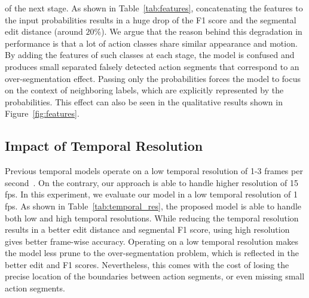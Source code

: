 \documentclass[10pt,twocolumn,letterpaper]{article}
\begin{document}
of the next stage. As shown in Table~\ref{tab:features}, concatenating 
the features to the input probabilities results in a huge drop of the F1 score 
and the segmental edit distance (around $20\%$). We argue that the reason behind this 
degradation in performance is that a lot of action classes share similar appearance 
and motion. By adding the features of such classes at each stage, the model 
is confused and produces small separated falsely detected action segments 
that correspond to an over-segmentation effect. Passing only the probabilities 
forces the model to focus on the context of neighboring labels, which are explicitly 
represented by the probabilities. This effect can also be seen in the qualitative 
results shown in Figure~\ref{fig:features}.


\subsection{Impact of Temporal Resolution}

Previous temporal models operate on a low temporal resolution of 1-3 frames 
per second~\cite{Lea_2017_CVPR, lei2018temporal, ding2018weakly}. On the 
contrary, our approach is able to handle higher resolution of 15 fps. 
In this experiment, we evaluate our model in a low temporal resolution of 
1 fps. As shown in Table~\ref{tab:temporal_res}, the proposed model is able 
to handle both low and high temporal resolutions. While reducing the 
temporal resolution results in a better edit distance and segmental F1 score, 
using high resolution gives better frame-wise accuracy. Operating on a low 
temporal resolution makes the model less prune to the over-segmentation problem, 
which is reflected in the better edit and F1 scores. Nevertheless, this comes 
with the cost of losing the precise location of the boundaries between action 
segments, or even missing small action segments.

\begin{table}[tb]
\centering
{}
\caption{Impact of temporal resolution on the 50Salads dataset.}
\label{tab:temporal_res}
\end{table}
\end{document}

